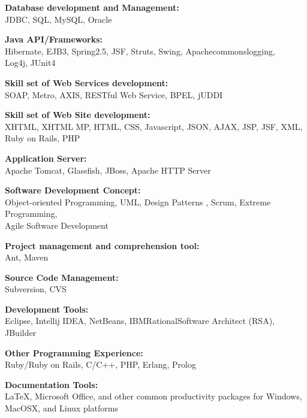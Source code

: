 \documentclass[10pt]{article}
\newcommand{\blankline}{\quad\pagebreak[2]}
\begin{document}
\blankline

{\textbf{Database development and Management:}}\\
JDBC, SQL, MySQL, Oracle

\blankline

{\textbf{Java API/Frameworks:}}\\
Hibernate, EJB3, Spring2.5, JSF, Struts, Swing, Apache\nobreak\space commons\nobreak\space logging,\\ Log4j, JUnit4 

\blankline


{\textbf{Skill set of Web Services development:}}\\
SOAP, Metro, AXIS, RESTful Web Service, BPEL, jUDDI


\blankline


{\textbf{Skill set of Web Site development:}}\\
XHTML, XHTML MP, HTML, CSS, Javascript, JSON, AJAX, JSP, JSF, XML,\\ Ruby \nobreak on \nobreak Rails, PHP 

\blankline

{\textbf{Application Server:}}\\
Apache Tomcat, Glassfish, JBoss, Apache HTTP Server

\blankline

{\textbf{Software Development Concept:}}\\
Object-oriented Programming, UML, Design \nolinebreak Patterns
, Scrum, Extreme Programming,\\ Agile Software Development

\blankline

{\textbf{Project management and comprehension tool:}}\\
Ant, Maven

\blankline


{\textbf{Source Code Management:}}\\
Subversion, CVS

\blankline

{\textbf{Development Tools:}}\\
Eclipse, Intellij IDEA, NetBeans, IBM\circledR\space Rational\circledR\space Software Architect (RSA), JBuilder


\blankline

{\textbf{Other Programming Experience:}}\\
Ruby/Ruby on Rails, C/C++, PHP, Erlang, Prolog

\blankline

{\textbf{Documentation Tools:}}\\ 
\LaTeX{}, Microsoft Office,
and other common productivity packages for Windows,\\  Mac\nolinebreak OS\nolinebreak X, and
Linux platforms
\end{document}
